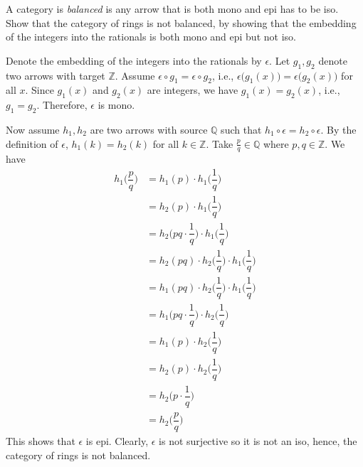 \documentclass[11pt,a4paper]{article}
\begin{document}
\begin{exercise}
    A category is \textit{balanced} is any arrow that is both mono and epi has to be iso. Show that the category of rings is not balanced, by showing that the embedding of the integers into the rationals is both mono and epi but not iso.
\end{exercise}
\begin{solution}
    Denote the embedding of the integers into the rationals by $\epsilon$. Let $g_1, g_2$ denote two arrows with target $\mathbb{Z}$. Assume $\epsilon\circ g_1 = \epsilon\circ g_2$, i.e., $\epsilon\big(g_1(x)\big) = \epsilon\big(g_2(x)\big)$ for all $x$. Since $g_1(x)$ and $g_2(x)$ are integers, we have $g_1(x)=g_2(x)$, i.e., $g_1=g_2$. Therefore, $\epsilon$ is mono.\par
    Now assume $h_1, h_2$ are two arrows with source $\mathbb{Q}$ such that $h_1\circ\epsilon=h_2\circ\epsilon$. By the definition of $\epsilon$, $h_1(k)=h_2(k)$ for all $k\in\mathbb{Z}$. Take $\frac{p}{q}\in\mathbb{Q}$ where $p,q\in\mathbb{Z}$. We have
    \begin{align*}
        h_1\Big(\dfrac{p}{q}\Big) &= h_1(p)\cdot h_1\Big(\dfrac{1}{q}\Big)\\
                          &= h_2(p)\cdot h_1\Big(\dfrac{1}{q}\Big)\\
                          &= h_2\Big(pq\cdot \dfrac{1}{q}\Big)\cdot h_1\Big(\dfrac{1}{q}\Big)\\
                          &= h_2(pq)\cdot h_2\Big(\dfrac{1}{q}\Big) \cdot h_1\Big(\dfrac{1}{q}\Big)\\
                          &= h_1(pq)\cdot h_2\Big(\dfrac{1}{q}\Big) \cdot h_1\Big(\dfrac{1}{q}\Big)\\
                          &= h_1\Big(pq\cdot \dfrac{1}{q}\Big)\cdot h_2\Big(\dfrac{1}{q}\Big)\\
                          &= h_1(p)\cdot h_2\Big(\dfrac{1}{q}\Big)\\
                          &= h_2(p)\cdot h_2\Big(\dfrac{1}{q}\Big)\\
                          &= h_2\Big(p\cdot \dfrac{1}{q}\Big)\\
                          &= h_2\Big(\dfrac{p}{q}\Big)
    \end{align*}
    This shows that $\epsilon$ is epi. Clearly, $\epsilon$ is not surjective so it is not an iso, hence, the category of rings is not balanced.
\end{solution}
\end{document}
